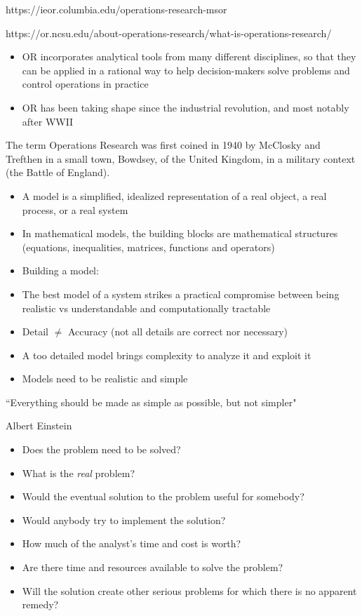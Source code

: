 https://ieor.columbia.edu/operations-research-msor

https://or.ncsu.edu/about-operations-research/what-is-operations-research/


\begin{itemize}
  \item OR incorporates analytical tools from many different disciplines, so that they can be applied in a rational way to help decision-makers solve problems and control operations in practice
  \item OR has been taking shape since the industrial revolution, and most notably after WWII
\end{itemize}
The term Operations Research was first coined in 1940 by McClosky and Trefthen
in a small town, Bowdsey, of the United Kingdom, in a military context (the Battle of England).



  \begin{itemize}
    \item A model is a simplified, idealized representation of a real object, a real process, or a real system
    \item In mathematical models, the building blocks are mathematical structures (equations, inequalities, matrices, functions and operators)
    \item Building a model:
          
  \end{itemize}



  \begin{itemize}
    \item The best model of a system strikes a practical compromise between being realistic vs understandable and computationally tractable
    \item Detail $\neq$ Accuracy (not all details are correct nor necessary)
    \item A too detailed model brings complexity to analyze it and exploit it
    \item Models need to be realistic and simple
  \end{itemize}
  \epigraph{``Everything should be made as simple as possible, but not simpler"}{Albert Einstein}




  \begin{itemize}
    \item Does the problem need to be solved?
    \item What is the {\it real} problem?
    \item Would the eventual solution to the problem useful for somebody?
    \item Would anybody try to implement the solution?
    \item How much of the analyst's time and cost is worth?
    \item Are there time and resources available to solve the problem?
    \item Will the solution create other serious problems for which there is no apparent remedy?
  \end{itemize}


